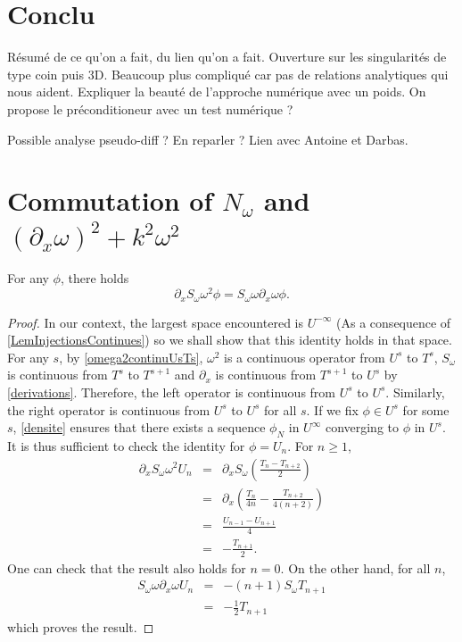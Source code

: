 \documentclass[a4paper]{article}
\begin{document}
\section{Conclu}

Résumé de ce qu'on a fait, du lien qu'on a fait. Ouverture sur les singularités de type coin puis 3D. Beaucoup plus compliqué car pas de relations analytiques qui nous aident. 
Expliquer la beauté de l'approche numérique avec un poids. On propose le préconditioneur avec un test numérique ? 

Possible analyse pseudo-diff ? En reparler ? Lien avec Antoine et Darbas. 
	
\appendix
\section{Commutation of $N_\omega$ and $(\partial_x \omega)^2 + k^2\omega^2$}
\label{ann:commut}
\begin{Lem}
	\label{dxSomega2=Somegadxomega}
	For any $\phi$, there holds 
	\[\partial_x S_\omega \omega^2 \phi = S_\omega \omega \partial_x \omega \phi.\]
\end{Lem}
\begin{proof}
	In our context, the largest space encountered is $U^{- \infty}$ (As a consequence of \autoref{LemInjectionsContinues}) so we shall show that this identity holds in that space.
	For any $s$, by \autoref{omega2continuUsTs}, $\omega^2$ is a continuous operator from $U^s$ to $T^s$, $S_\omega$ is continuous from $T^s$ to $T^{s+1}$ and $\partial_x$ is continuous from $T^{s+1}$ to $U^s$ by \autoref{derivations}. Therefore, the left operator is continuous from $U^s$ to $U^s$. Similarly, the right operator is continuous from $U^{s}$ to $U^s$ for all $s$. If we fix $\phi \in U^{s}$ for some $s$, \autoref{densite} ensures that there exists a sequence $\phi_N$ in $U^{\infty}$ converging to $\phi$ in $U^{s}$. It is thus sufficient to check the identity for $\phi = U_n$. For $n \geq 1$, 
	\begin{eqnarray}
		\partial_x S_\omega \omega^2 U_n &=& \partial_x S_\omega \left(\frac{T_{n} - T_{n+2}}{2}\right)\\
		&=& \partial_x\left(\frac{T_{n}}{4n} - \frac{T_{n+2}}{4(n+2)} \right)\\
		&=& \frac{U_{n-1} - U_{n+1}}{4}\\
		&=& -\frac{T_{n+1}}{2}.
	\end{eqnarray}
	One can check that the result also holds for $n = 0$. On the other hand, for all $n$, 
	\begin{eqnarray}
		S_\omega \omega \partial_x \omega U_n &=&-(n+1) S_\omega T_{n+1}\\
		&=& -\frac{1}{2}T_{n+1}
	\end{eqnarray}
	which proves the result. 
\end{proof}
\end{document}
